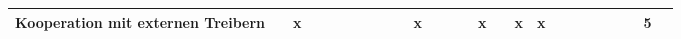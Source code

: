 \begin{sidewaystable}[ht]
\begin{tabular}{|p{6cm}|c|c|c|c|c|c|c|c|c|c|c|c|c|c|c|c|c|c|c|c|c|c|c|c|c|}
		Kooperation mit externen Treibern                   &                   & x                  &                    &                      &                    &                   &                   &                      &                    & x                    &                  &                  &                     & x                &                 & x                    & x                  &                 &                  &                  &                        &                      &                        & 5 \\
		\hline
	\end{tabular}
	\label{tab:clusteringchangeprocess}
\end{sidewaystable}

